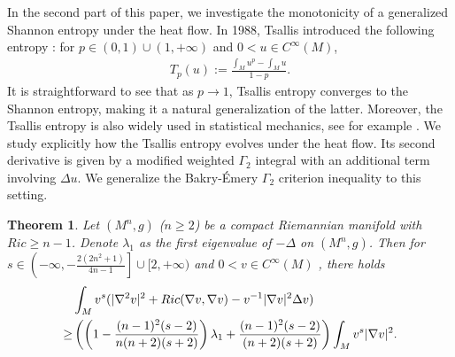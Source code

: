 \documentclass[11pt]{amsart}
\newtheorem{theorem}{Theorem}
\numberwithin{equation}{section}
\numberwithin{lemma}{section}
\numberwithin{proposition}{section}
\numberwithin{corollary}{section}
\numberwithin{remark}{section}
\begin{document}

 In the second part of this paper, we investigate the monotonicity of a generalized Shannon entropy under the heat flow. In 1988, Tsallis introduced the following entropy \cite{Tsa88}: for $p\in(0,1)\cup(1,+\infty)$ and $0<u\in C^{\infty}(M)$,
\begin{align*}
    T_p(u):=\frac{\int_M u^p-\int_M u}{1-p}.
\end{align*}
It is straightforward to see that as $p\to 1$, Tsallis entropy converges to the Shannon entropy, making it a natural generalization of the latter. Moreover, the Tsallis entropy is also widely used in statistical mechanics, see for example \cite{PP93, Lut03, Tsa09}. We study explicitly how the Tsallis entropy evolves under the heat flow. Its second derivative is given by a modified weighted $\Gamma_2$ integral with an additional term involving $\Delta u$.
 We generalize the Bakry-\'Emery $\Gamma_2$ criterion inequality to this setting. 
 \begin{theorem}\label{thm. modified weighted Gamma2}
    Let $(M^n,g)$ ($n\geq 2$) be a compact Riemannian manifold with $Ric\geq n-1$. 
    Denote $\lambda_1$ as the first eigenvalue of $-\Delta $ on $(M^n,g)$.
    Then for $s\in\left(-\infty,-\frac{2(2n^2+1)}{4n-1}\right]
    \cup[2,+\infty)$ and $0<v\in C^{\infty}(M)$ , there holds
    \begin{align}
        &\int_M v^s(|\nabla^2 v|^2+Ric(\nabla v,\nabla v)-v^{-1}|\nabla v|^2\Delta v)\notag\\
        \geq &
        \left(\left(1-\frac{(n-1)^2(s-2)}{n(n+2)(s+2)}
        \right)\lambda_1
        +\frac{(n-1)^2(s-2)}{(n+2)(s+2)}
        \right)
        \int_M v^s|\nabla v|^2.\label{ineq. interpolated BE Gamma2}
    \end{align}
\end{theorem}
\end{document}
